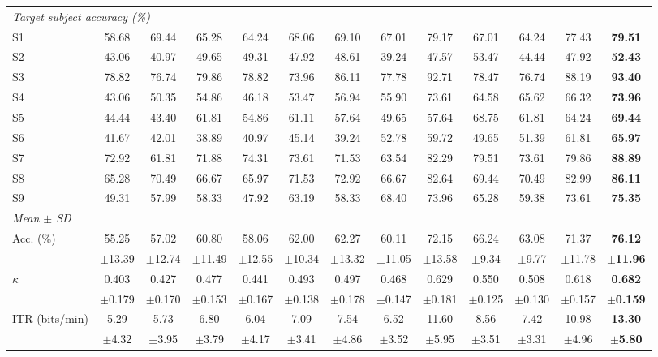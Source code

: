 \documentclass[preprint,12pt]{elsarticle}
\begin{document}
\begin{table}
\begin{adjustbox}{max width=\dimexpr\textheight+80pt\relax}
\begin{tabular}{l@{\hspace{6pt}}cccccc@{\hspace{6pt}}cc@{\hspace{6pt}}ccc@{\hspace{6pt}}c}
\midrule
\multicolumn{13}{l}{\textit{Target subject accuracy (\%)}} \\
S1 & 58.68 & 69.44 & 65.28 & 64.24 & 68.06 & 69.10 & 67.01 & 79.17 & 67.01 & 64.24 & 77.43 & \textbf{79.51} \\
S2 & 43.06 & 40.97 & 49.65 & 49.31 & 47.92 & 48.61 & 39.24 & 47.57 & 53.47 & 44.44 & 47.92 & \textbf{52.43} \\
S3 & 78.82 & 76.74 & 79.86 & 78.82 & 73.96 & 86.11 & 77.78 & 92.71 & 78.47 & 76.74 & 88.19 & \textbf{93.40} \\
S4 & 43.06 & 50.35 & 54.86 & 46.18 & 53.47 & 56.94 & 55.90 & 73.61 & 64.58 & 65.62 & 66.32 & \textbf{73.96} \\
S5 & 44.44 & 43.40 & 61.81 & 54.86 & 61.11 & 57.64 & 49.65 & 57.64 & 68.75 & 61.81 & 64.24 & \textbf{69.44} \\
S6 & 41.67 & 42.01 & 38.89 & 40.97 & 45.14 & 39.24 & 52.78 & 59.72 & 49.65 & 51.39 & 61.81 & \textbf{65.97} \\
S7 & 72.92 & 61.81 & 71.88 & 74.31 & 73.61 & 71.53 & 63.54 & 82.29 & 79.51 & 73.61 & 79.86 & \textbf{88.89} \\
S8 & 65.28 & 70.49 & 66.67 & 65.97 & 71.53 & 72.92 & 66.67 & 82.64 & 69.44 & 70.49 & 82.99 & \textbf{86.11} \\
S9 & 49.31 & 57.99 & 58.33 & 47.92 & 63.19 & 58.33 & 68.40 & 73.96 & 65.28 & 59.38 & 73.61 & \textbf{75.35} \\
\midrule
\multicolumn{13}{l}{\textit{Mean $\pm$ SD}} \\
Acc. (\%) & 55.25 & 57.02 & 60.80 & 58.06 & 62.00 & 62.27 & 60.11 & 72.15 & 66.24 & 63.08 & 71.37 & \textbf{76.12} \\
 & $\pm$13.39 & $\pm$12.74 & $\pm$11.49 & $\pm$12.55 & $\pm$10.34 & $\pm$13.32 & $\pm$11.05 & $\pm$13.58 & $\pm$9.34 & $\pm$9.77 & $\pm$11.78 & \textbf{$\pm$11.96} \\
$\kappa$ & 0.403 & 0.427 & 0.477 & 0.441 & 0.493 & 0.497 & 0.468 & 0.629 & 0.550 & 0.508 & 0.618 & \textbf{0.682} \\
 & $\pm$0.179 & $\pm$0.170 & $\pm$0.153 & $\pm$0.167 & $\pm$0.138 & $\pm$0.178 & $\pm$0.147 & $\pm$0.181 & $\pm$0.125 & $\pm$0.130 & $\pm$0.157 & \textbf{$\pm$0.159} \\
ITR (bits/min) & 5.29 & 5.73 & 6.80 & 6.04 & 7.09 & 7.54 & 6.52 & 11.60 & 8.56 & 7.42 & 10.98 & \textbf{13.30} \\
 & $\pm$4.32 & $\pm$3.95 & $\pm$3.79 & $\pm$4.17 & $\pm$3.41 & $\pm$4.86 & $\pm$3.52 & $\pm$5.95 & $\pm$3.51 & $\pm$3.31 & $\pm$4.96 & \textbf{$\pm$5.80} \\

\end{tabular}
\end{adjustbox}
\end{table}
\end{document}
